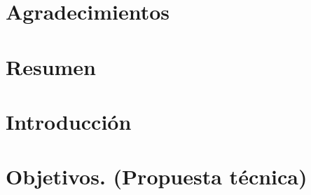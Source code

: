 \documentclass[12pt]{article}
\begin{document}
\section*{Agradecimientos}  

\newpage

  
  \thispagestyle{empty} \tableofcontents \thispagestyle{empty} %
  \newpage
  \setcounter{page}{1}

  \section{Resumen}  
  
  

  \newpage


  \section{Introducción}  

  

  \newpage


  \section{Objetivos. (Propuesta técnica)}  

    

  \newpage

\end{document}

